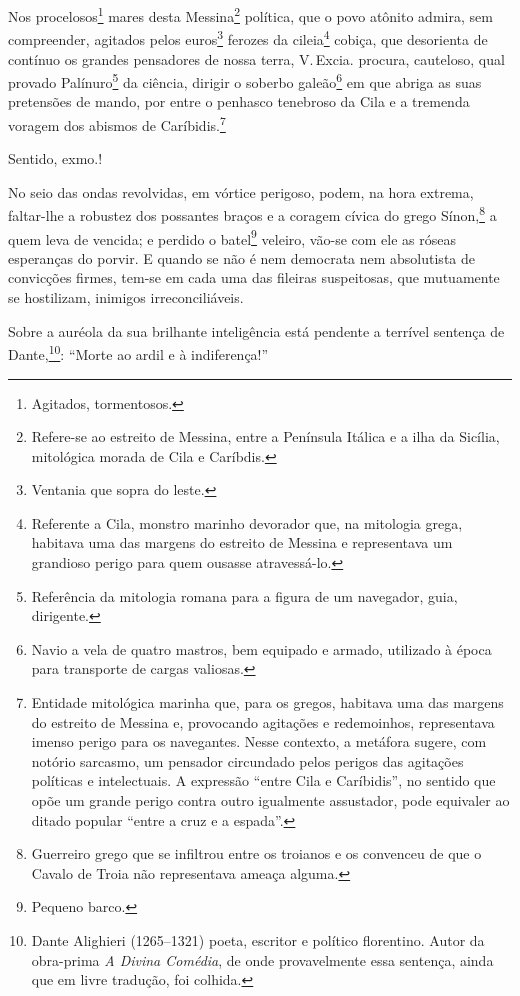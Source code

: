 Nos procelosos\footnote{Agitados, tormentosos.} mares desta
Messina\footnote{Refere-se ao estreito de Messina, entre a Península
Itálica e a ilha da Sicília, mitológica morada de Cila e Caríbdis.}
política, que o povo atônito admira, sem compreender, agitados pelos
euros\footnote{Ventania que sopra do leste.} ferozes da
cileia\footnote{Referente a Cila, monstro marinho devorador que, na
  mitologia grega, habitava uma das margens do estreito de Messina e
  representava um grandioso perigo para quem ousasse atravessá-lo.}
cobiça, que desorienta de contínuo os grandes pensadores de nossa terra,
V.\,Excia. procura, cauteloso, qual provado Palínuro\footnote{
  Referência da mitologia romana para a figura de um navegador, guia,
  dirigente.} da ciência, dirigir o soberbo galeão\footnote{Navio a
  vela de quatro mastros, bem equipado e armado, utilizado à época para
  transporte de cargas valiosas.} em que abriga as suas pretensões de
mando, por entre o penhasco tenebroso da Cila e a tremenda voragem dos abismos de
Caríbidis.\footnote{Entidade mitológica marinha que, para os gregos,
  habitava uma das margens do estreito de Messina e, provocando
  agitações e redemoinhos, representava imenso perigo para os
  navegantes. Nesse contexto, a metáfora sugere, com notório sarcasmo,
  um pensador circundado pelos perigos das agitações políticas e
  intelectuais. A expressão ``entre Cila e Caríbidis'', no sentido que
  opõe um grande perigo contra outro igualmente assustador, pode
  equivaler ao ditado popular ``entre a cruz e a espada''.}

Sentido, exmo.!

No seio das ondas revolvidas, em vórtice perigoso, podem, na hora
extrema, faltar-lhe a robustez dos possantes braços e a coragem cívica
do grego Sínon,\footnote{Guerreiro grego que se infiltrou entre os
  troianos e os convenceu de que o Cavalo de Troia não representava
  ameaça alguma.} a quem leva de vencida; e perdido o batel\footnote{
  Pequeno barco.} veleiro, vão-se com ele as róseas esperanças do
porvir. E quando se não é nem democrata nem absolutista de convicções
firmes, tem-se em cada uma das fileiras suspeitosas, que mutuamente se
hostilizam, inimigos irreconciliáveis.

Sobre a auréola da sua brilhante inteligência está pendente a terrível
sentença de Dante,\footnote{Dante Alighieri (1265--1321) poeta,
  escritor e político florentino. Autor da obra-prima \emph{A Divina
  Comédia}, de onde provavelmente essa sentença, ainda que em livre
  tradução, foi colhida.}: ``Morte ao ardil e à indiferença!''

